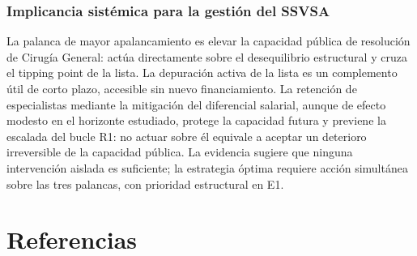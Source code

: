 \documentclass[12pt,a4paper]{article}
\begin{document}
\subsubsection*{Implicancia sistémica para la gestión del SSVSA}

La palanca de mayor apalancamiento es elevar la capacidad pública de resolución de Cirugía General: actúa directamente sobre el desequilibrio estructural y cruza el tipping point de la lista. La depuración activa de la lista es un complemento útil de corto plazo, accesible sin nuevo financiamiento. La retención de especialistas mediante la mitigación del diferencial salarial, aunque de efecto modesto en el horizonte estudiado, protege la capacidad futura y previene la escalada del bucle R1: no actuar sobre él equivale a aceptar un deterioro irreversible de la capacidad pública. La evidencia sugiere que ninguna intervención aislada es suficiente; la estrategia óptima requiere acción simultánea sobre las tres palancas, con prioridad estructural en E1.

\newpage
\section*{Referencias}
\end{document}
